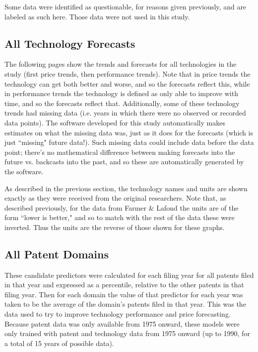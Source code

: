 \documentclass{article}
\begin{document}
Some data were identified as questionable, for reasons given previously, and are labeled as such here. Those data were not used in this study.

\begin{landscape}

\end{landscape}
\restoregeometry

\subsection{All Technology Forecasts}\label{Each_Technology_Forecast}
The following pages show the trends and forecasts for all technologies in the study (first price trends, then performance trends). Note that in price trends the technology can get both better and worse, and so the forecasts reflect this, while in performance trends the technology is defined as only able to improve with time, and so the forecasts reflect that. Additionally, some of these technology trends had missing data (i.e. years in which there were no observed or recorded data points). The software developed for this study automatically makes estimates on what the missing data was, just as it does for the forecasts (which is just ``missing" future data!). Such missing data could include data before the data point; there's no mathematical difference between making forecasts into the future vs. backcasts into the past, and so these are automatically generated by the software.

As described in the previous section, the technology names and units are shown exactly as they were received from the original researchers. Note that, as described previously, for the data from Farmer \& Lafond the units are of the form ``lower is better," and so to match with the rest of the data these were inverted. Thus the units are the reverse of those shown for these graphs.



\subsection{All Patent Domains}\label{patent_data}
These candidate predictors were calculated for each filing year for all patents filed in that year and expressed as a percentile, relative to the other patents in that filing year. Then for each domain the value of that predictor for each year was taken to be the average of the domain's patents filed in that year. This was the data used to try to improve technology performance and price forecasting. Because patent data was only available from 1975 onward, these models were only trained with patent and technology data from 1975 onward (up to 1990, for a total of 15 years of possible data).
\end{document}
